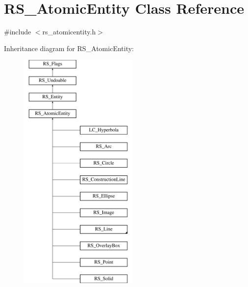 \hypertarget{classRS__AtomicEntity}{\section{R\-S\-\_\-\-Atomic\-Entity Class Reference}
\label{classRS__AtomicEntity}
}


{\ttfamily \#include $<$rs\-\_\-atomicentity.\-h$>$}

Inheritance diagram for R\-S\-\_\-\-Atomic\-Entity\-:\begin{figure}[H]
\begin{center}
\leavevmode
\includegraphics[height=12.000000cm]{classRS__AtomicEntity}
\end{center}
\end{figure}
